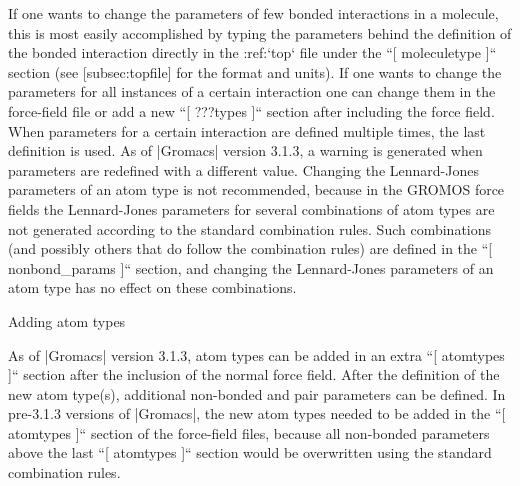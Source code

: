 If one wants to change the parameters of few bonded interactions in a
molecule, this is most easily accomplished by typing the parameters
behind the definition of the bonded interaction directly in the
:ref:`top` file under the ``[ moleculetype ]``
section (see [subsec:topfile] for the format and units).
If one wants to change the parameters for all instances of a
certain interaction one can change them in the force-field file or add a
new ``[ ???types ]`` section after including the force
field. When parameters for a certain interaction are defined multiple
times, the last definition is used. As of |Gromacs| version 3.1.3, a
warning is generated when parameters are redefined with a different
value. Changing the Lennard-Jones parameters of an atom type is not
recommended, because in the GROMOS force fields the Lennard-Jones
parameters for several combinations of atom types are not generated
according to the standard combination rules. Such combinations (and
possibly others that do follow the combination rules) are defined in the
``[ nonbond_params ]`` section, and changing the
Lennard-Jones parameters of an atom type has no effect on these
combinations.

Adding atom types
~~~~~~~~~~~~~~~~~

As of |Gromacs| version 3.1.3, atom types can be added in an extra
``[ atomtypes ]`` section after the inclusion of the
normal force field. After the definition of the new atom type(s),
additional non-bonded and pair parameters can be defined. In pre-3.1.3
versions of |Gromacs|, the new atom types needed to be added in the
``[ atomtypes ]`` section of the force-field files, because
all non-bonded parameters above the last ``[ atomtypes ]``
section would be overwritten using the standard combination rules.
